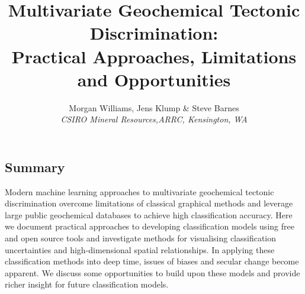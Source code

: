 \documentclass[a4,10pt]{article}
\date{}
\title{Multivariate Geochemical Tectonic Discrimination:\\Practical Approaches, Limitations and Opportunities}
\author{Morgan Williams, Jens Klump \& Steve Barnes\\\footnotesize{\textit{CSIRO Mineral Resources,ARRC, Kensington, WA}}}
\begin{document}
		
	\maketitle

	\subsection*{Summary}
	
	Modern machine learning approaches to multivariate geochemical tectonic discrimination overcome limitations of classical graphical methods and leverage large public geochemical databases to achieve high classification accuracy. Here we document practical approaches to developing classification models using free and open source tools and investigate methods for visualising classification uncertainties and high-dimensional spatial relationships. In applying these classification methods into deep time, issues of biases and secular change become apparent. We discuss some opportunities to build upon these models and provide richer insight for future classification models.
	
\end{document}
